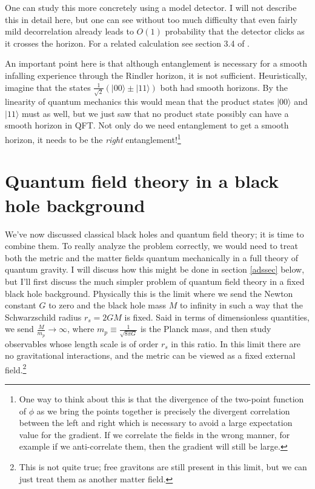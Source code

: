 \documentclass[12pt]{article}
\newcommand{\ran}{\rangle}
\begin{document}
One can study this more concretely using a model detector.  I will not describe this in detail here, but one can see without too much difficulty that even fairly mild decorrelation already leads to $O(1)$ probability that the detector clicks as it crosses the horizon.  For a related calculation see section 3.4 of \cite{Giddings:2006sj}. 

An important point here is that although entanglement is necessary for a smooth infalling experience through the Rindler horizon, it is not sufficient.  Heuristically, imagine that the states $\frac{1}{\sqrt{2}}\left(|00\ran\pm|11\ran\right)$ both had smooth horizons.  By the linearity of quantum mechanics this would mean that the product states $|00\ran$ and $|11\ran$ must as well, but we just saw that no product state possibly can have a smooth horizon in QFT.  Not only do we need entanglement to get a smooth horizon, it needs to be the \textit{right} entanglement!\footnote{One way to think about this is that the divergence of the two-point function of $\phi$ as we bring the points together is precisely the divergent correlation between the left and right which is necessary to avoid a large expectation value for the gradient.  If we correlate the fields in the wrong manner, for example if we anti-correlate them, then the gradient will still be large.} 

\section{Quantum field theory in a black hole background}\label{qftbhsec}
We've now discussed classical black holes and quantum field theory; it is time to combine them.  To really analyze the problem correctly, we would need to treat both the metric and the matter fields quantum mechanically in a full theory of quantum gravity.  I will discuss how this might be done in section \ref{adssec} below, but I'll first discuss the much simpler problem of quantum field theory in a fixed black hole background.  Physically this is the limit where we send the Newton constant $G$ to zero and the black hole mass $M$ to infinity in such a way that the Schwarzschild radius $r_s=2GM$ is fixed.  Said in terms of dimensionless quantities, we send $\frac{M}{m_p}\to\infty$, where $m_p\equiv \frac{1}{\sqrt{8\pi G}}$ is the Planck mass, and then study observables whose length scale is of order $r_s$ in this ratio.  In this limit there are no gravitational interactions, and the metric can be viewed as a fixed external field.\footnote{This is not quite true; free gravitons are still present in this limit, but we can just treat them as another matter field.}
\end{document}
